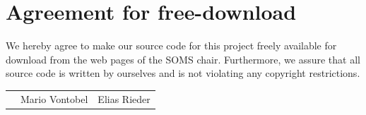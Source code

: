 \documentclass[11pt]{article}
\begin{document}

\newpage


\newpage
\section*{Agreement for free-download}
\bigskip


\bigskip


\large We hereby agree to make our source code for this project freely available for download from the web pages of the SOMS chair. Furthermore, we assure that all source code is written by ourselves and is not violating any copyright restrictions.

\begin{center}

\bigskip


\bigskip


\begin{tabular}{@{}p{3.3cm}@{}p{6cm}@{}@{}p{6cm}@{}}
\begin{minipage}{3cm}

\end{minipage}
&
\begin{minipage}{6cm}
\vspace{2mm} \large Mario Vontobel

 \vspace{\baselineskip}

\end{minipage}
&
\begin{minipage}{6cm}

\large Elias Rieder

\end{minipage}
\end{tabular}


\end{center}
\newpage







\tableofcontents

\newpage

\end{document}
